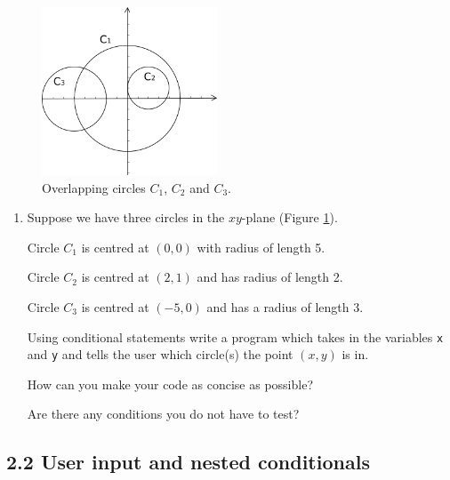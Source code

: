 \documentclass[11pt]{report}
\begin{document}
\begin{figure}[!h]
        \centering
        \includegraphics[height=5cm]{circles}
        \caption{Overlapping circles $C_1$, $C_2$ and $C_3$.}
        \label{fig:circles}
\end{figure}

\begin{enumerate}[label=(\Alph*)]
    
    \item Suppose we have three circles in the $xy$-plane (Figure \ref{fig:circles}). 
    
    Circle $C_1$ is centred at $(0, 0)$ with radius of length 5. 
    
    Circle $C_2$ is centred at $(2, 1)$ and has radius of length 2. 
    
    Circle $C_3$ is centred at $(-5, 0)$ and has a radius of length 3. 
    
    Using conditional statements write a program which takes in the variables {\tt x} and {\tt y} and tells the user which circle(s) the point $(x, y)$ is in. 
    
    How can you make your code as concise as possible? 
    
    Are there any conditions you do not have to test?
\end{enumerate}


    

    



\subsection*{\Large 2.2 User input and nested conditionals}
\end{document}
